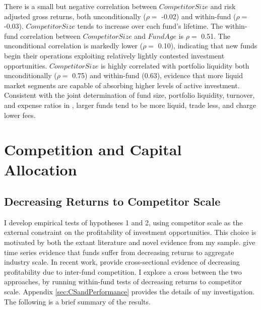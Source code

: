 \documentclass[]{book}
\theoremstyle{definition}
\theoremstyle{definition}
\theoremstyle{definition}
\theoremstyle{remark}
\begin{document}
There is a small but negative correlation between \(CompetitorSize\) and
risk adjusted gross returns, both unconditionally (\(\rho=\) -0.02) and
within-fund (\(\rho=\) -0.03). \(CompetitorSize\) tends to increase over
each fund's lifetime. The within-fund correlation between
\(CompetitorSize\) and \(FundAge\) is \(\rho=\) 0.51. The unconditional
correlation is markedly lower (\(\rho=\) 0.10), indicating that new
funds begin their operations exploiting relatively lightly contested
investment opportunities. \(CompetitorSize\) is highly correlated with
portfolio liquidity both unconditionally (\(\rho=\) 0.75) and
within-fund (0.63), evidence that more liquid market segments are
capable of absorbing higher levels of active investment. Consistent with
the joint determination of fund size, portfolio liquidity, turnover, and
expense ratios in \citet{pst17L}, larger funds tend to be more liquid,
trade less, and charge lower fees.

\hypertarget{sec:portfolio}{%
\chapter{Competition and Capital Allocation}\label{sec:portfolio}}

\hypertarget{decreasing-returns-to-competitor-scale}{%
\section{Decreasing Returns to Competitor
Scale}\label{decreasing-returns-to-competitor-scale}}

I develop empirical tests of hypotheses 1 and 2, using competitor scale
as the external constraint on the profitability of investment
opportunities. This choice is motivated by both the extant literature
and novel evidence from my sample. \citet{pst15} give time series
evidence that funds suffer from decreasing returns to aggregate industry
scale. In recent work, \citet{hkp17} provide cross-sectional evidence of
decreasing profitability due to inter-fund competition. I explore a
cross between the two approaches, by running within-fund tests of
decreasing returns to competitor scale. Appendix
\ref{sec:CSandPerformance} provides the details of my investigation. The
following is a brief summary of the results.
\end{document}
